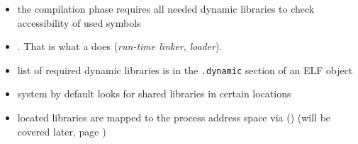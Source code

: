 

\begin{slide}

\begin{itemize}
\item the compilation phase requires all needed dynamic libraries to check
accessibility of used symbols
\item {}. That is what a  does  (\emph{run-time
linker}, \emph{loader}).
\item list of required dynamic libraries is in the \texttt{.dynamic} section of
an ELF object
\item system by default looks for shared libraries in certain locations
\item located libraries are mapped to the process address space via
() (will be covered later, page \pageref{MMAP})
\end{itemize}
\end{slide}


